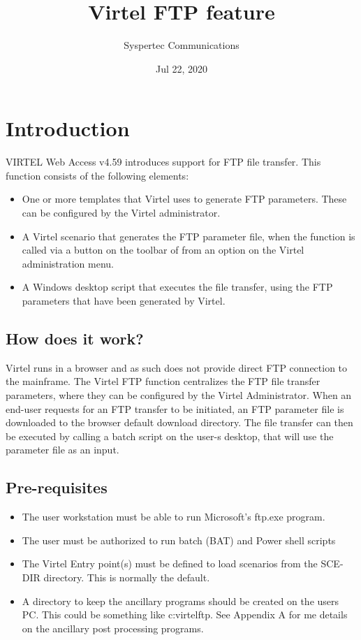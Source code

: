 \documentclass[letterpaper,10pt,english]{sphinxmanual}
\title{Virtel FTP feature}
\date{Jul 22, 2020}
\author{Syspertec Communications}
\begin{document}
\pagestyle{empty}
\sphinxmaketitle
\pagestyle{plain}
\sphinxtableofcontents
\pagestyle{normal}
\label{\detokenize{TN201905::doc}}



\chapter{Introduction}
\label{\detokenize{TN201905:introduction}}
VIRTEL Web Access v4.59 introduces support for FTP file transfer. This function consists of the following elements:
\begin{itemize}
\item {} 
One or more templates that Virtel uses to generate FTP parameters. These can be configured by the Virtel administrator.

\item {} 
A Virtel scenario that generates the FTP parameter file, when the function is called via a button on the toolbar of from an option on the Virtel administration menu.

\item {} 
A Windows desktop script that executes the file transfer, using the FTP parameters that have been generated by Virtel.

\end{itemize}


\section{How does it work?}
\label{\detokenize{TN201905:how-does-it-work}}
Virtel runs in a browser and as such does not provide direct FTP connection to the mainframe. The Virtel FTP function centralizes the FTP file transfer parameters, where they can be configured by the Virtel Administrator. When an end-user requests for an FTP transfer to be initiated, an FTP parameter file is downloaded to the browser default download directory. The file transfer can then be executed by calling a batch script on the user-s desktop, that will use the parameter file as an input.


\section{Pre-requisites}
\label{\detokenize{TN201905:pre-requisites}}\begin{itemize}
\item {} 
The user workstation must be able to run Microsoft’s ftp.exe program.

\item {} 
The user must be authorized to run batch (BAT) and Power shell scripts

\item {} 
The Virtel Entry point(s) must be defined to load scenarios from the SCE-DIR directory. This is normally the default.

\item {} 
A directory to keep the ancillary programs should be created on the users PC. This could be something like c:virtelftp. See Appendix A for me details on the ancillary post processing programs.

\end{itemize}
\end{document}
